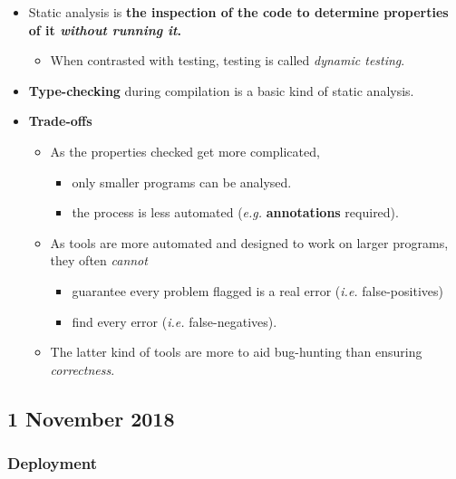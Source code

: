 \documentclass[a4paper]{article}
\providecommand{\tightlist}{%
  \setlength{\itemsep}{0pt}\setlength{\parskip}{0pt}}
\begin{document}
\begin{itemize}
\tightlist
\item
  Static analysis is \textbf{the inspection of the code to determine
  properties of it \emph{without running it}.}

  \begin{itemize}
  \tightlist
  \item
    When contrasted with testing, testing is called \emph{dynamic
    testing}.
  \end{itemize}
\item
  \textbf{Type-checking} during compilation is a basic kind of static
  analysis.
\item
  \textbf{Trade-offs}

  \begin{itemize}
  \tightlist
  \item
    As the properties checked get more complicated,

    \begin{itemize}
    \tightlist
    \item
      only smaller programs can be analysed.
    \item
      the process is less automated (\emph{e.g.} \textbf{annotations}
      required).
    \end{itemize}
  \item
    As tools are more automated and designed to work on larger programs,
    they often \emph{cannot}

    \begin{itemize}
    \tightlist
    \item
      guarantee every problem flagged is a real error (\emph{i.e.}
      false-positives)
    \item
      find every error (\emph{i.e.} false-negatives).
    \end{itemize}
  \item
    The latter kind of tools are more to aid bug-hunting than ensuring
    \emph{correctness}.
  \end{itemize}
\end{itemize}

\hypertarget{1-november-2018}{%
\subsection{1 November 2018}\label{1-november-2018}}

\hypertarget{deployment}{%
\subsubsection{Deployment}\label{deployment}}
\end{document}
